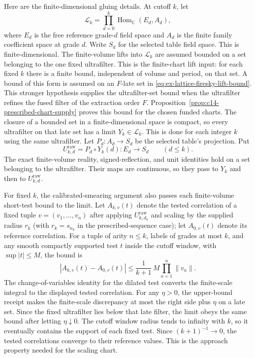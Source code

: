 Here are the finite-dimensional gluing details. At cutoff $k$, let
\[
 \mathscr L_k=\prod_{d=0}^{k}
 \operatorname{Hom}_{\mathbb C}(E_d,A_d),
\]
where $E_d$ is the free reference grade-$d$ field space and $A_d$ is the
finite family coefficient space at grade $d$. Write $S_d$ for the selected
table field space. This is finite-dimensional. The finite-volume lifts into
$\mathscr L_k$ are assumed bounded on a set belonging to the one fixed
ultrafilter. This is the finite-chart lift input: for each fixed $k$
there is a finite bound, independent of volume and period, on that set.
A bound of this form is assumed on an $F$-late set in
\eqref{eq:ex-lattice-firesky-lift-bound}. This stronger hypothesis supplies
the ultrafilter-set bound when the ultrafilter refines the fused filter of
the extraction order $F$.
Proposition~\ref{prop:c14-prescribed-chart-supply} proves this bound for the chosen funded charts. The closure of a bounded set in a
finite-dimensional space is compact, so every ultrafilter on that late set
has a limit $Y_k\in\mathscr L_k$. This is done for each integer $k$ using
the same ultrafilter. Let $P_d:A_d\to S_d$ be the selected table's
projection. Put
\[
 U^{\mathrm{raw}}_{k,d}=P_d\circ Y_k(d):E_d\longrightarrow S_d
 \qquad(d\le k).
\]
The exact finite-volume reality, signed-reflection, and unit identities hold
on a set belonging to the ultrafilter. Their maps are continuous, so they
pass to $Y_k$ and then to $U^{\mathrm{raw}}_{k,d}$.

For fixed $k$, the calibrated-smearing argument also passes each
finite-volume short-test bound to the limit. Let $A_{k,v}(t)$ denote the
tested correlation of a fixed tuple $v=(v_1,\ldots,v_n)$ after applying
$U^{\mathrm{raw}}_{k,d_a}$ and scaling by the supplied radius $r_k$
(with $r_k=s_{n_k}$ in the prescribed-sequence case); let $A_{0,v}(t)$ denote its reference
correlation. For a tuple of arity $n\le k$, labels of grades at most $k$, and any smooth compactly
supported test $t$ inside the cutoff window, with $\sup|t|\le M$, the bound
is
\begin{equation}
 |A_{k,v}(t)-A_{0,v}(t)|
 \le \frac{1}{k+1}\,M\prod_{a=1}^n\|v_a\|.
 \label{eq:ex-lattice-trace-test-error}
\end{equation}
The change-of-variables identity for the dilated test converts the
finite-scale integral to the displayed tested correlation. For any
$\eta>0$, the upper-bound receipt makes the finite-scale discrepancy at most
the right side plus $\eta$ on a late set. Since the fixed ultrafilter lies
below that late filter, the limit obeys the same bound after letting
$\eta\downarrow0$. The cutoff window
radius tends to infinity with $k$, so it eventually contains the support of
each fixed test. Since $(k+1)^{-1}\to0$, the tested correlations converge to
their reference values. This is the approach property needed for the
scaling chart.

